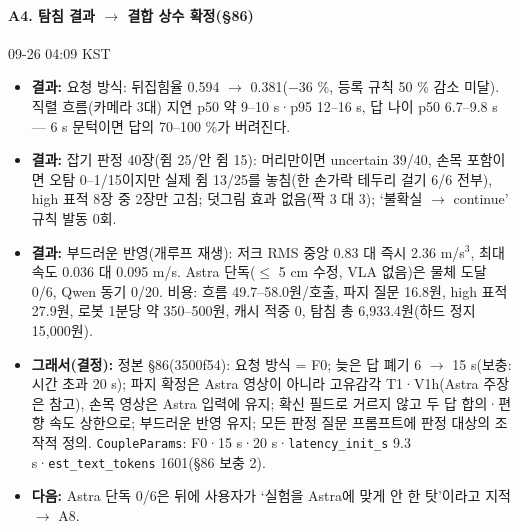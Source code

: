 \paragraph{A4. 탐침 결과 $\rightarrow$ 결합 상수 확정(§86)}
{\small 09-26 04:09 KST}
\begin{itemize}
  \item \textbf{결과:} 요청 방식: 뒤집힘율 0.594 $\rightarrow$ 0.381($-$36 \%, 등록 규칙 50 \% 감소 미달). 직렬 흐름(카메라 3대) 지연 p50 약 9--10 s·p95 12--16 s, 답 나이 p50 6.7--9.8 s --- 6 s 문턱이면 답의 70--100 \%가 버려진다.
  \item \textbf{결과:} 잡기 판정 40장(쥠 25/안 쥠 15): 머리만이면 uncertain 39/40, 손목 포함이면 오탐 0--1/15이지만 실제 쥠 13/25를 놓침(한 손가락 테두리 걸기 6/6 전부), high 표적 8장 중 2장만 고침; 덧그림 효과 없음(짝 3 대 3); `불확실 $\rightarrow$ continue' 규칙 발동 0회.
  \item \textbf{결과:} 부드러운 반영(개루프 재생): 저크 RMS 중앙 0.83 대 즉시 2.36 m/s$^3$, 최대 속도 0.036 대 0.095 m/s. Astra 단독($\leq$ 5 cm 수정, VLA 없음)은 물체 도달 0/6, Qwen 동기 0/20. 비용: 흐름 49.7--58.0원/호출, 파지 질문 16.8원, high 표적 27.9원, 로봇 1분당 약 350--500원, 캐시 적중 0, 탐침 총 6,933.4원(하드 정지 15,000원).
  \item \textbf{그래서(결정):} 정본 §86(3500f54): 요청 방식 = F0; 늦은 답 폐기 6 $\rightarrow$ 15 s(보충: 시간 초과 20 s); 파지 확정은 Astra 영상이 아니라 고유감각 T1·V1h(Astra 주장은 참고), 손목 영상은 Astra 입력에 유지; 확신 필드로 거르지 않고 두 답 합의·편향 속도 상한으로; 부드러운 반영 유지; 모든 판정 질문 프롬프트에 판정 대상의 조작적 정의. \texttt{CoupleParams}: F0·15 s·20 s·\texttt{latency\_\allowbreak{}init\_\allowbreak{}s} 9.3 s·\texttt{est\_\allowbreak{}text\_\allowbreak{}tokens} 1601(§86 보충 2).
  \item \textbf{다음:} Astra 단독 0/6은 뒤에 사용자가 `실험을 Astra에 맞게 안 한 탓'이라고 지적 $\rightarrow$ A8.
\end{itemize}

